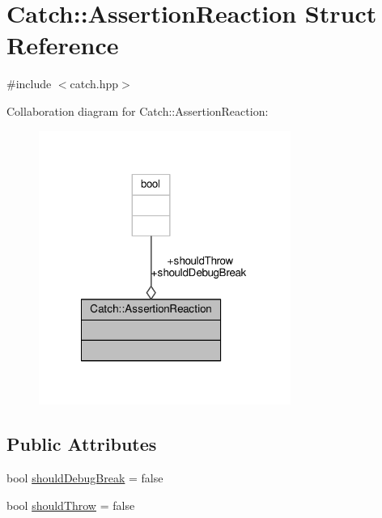 \hypertarget{struct_catch_1_1_assertion_reaction}{\section{Catch\-:\-:Assertion\-Reaction Struct Reference}
\label{struct_catch_1_1_assertion_reaction}
}


{\ttfamily \#include $<$catch.\-hpp$>$}



Collaboration diagram for Catch\-:\-:Assertion\-Reaction\-:
\nopagebreak
\begin{figure}[H]
\begin{center}
\leavevmode
\includegraphics[width=233pt]{struct_catch_1_1_assertion_reaction__coll__graph}
\end{center}
\end{figure}
\subsection*{Public Attributes}
\begin{DoxyCompactItemize}
\item 
bool \hyperlink{struct_catch_1_1_assertion_reaction_adcf30fb90ff20d9789df78d424652497}{should\-Debug\-Break} = false
\item 
bool \hyperlink{struct_catch_1_1_assertion_reaction_a82c8d95a2c1b6a331bde66982a8e090f}{should\-Throw} = false
\end{DoxyCompactItemize}


